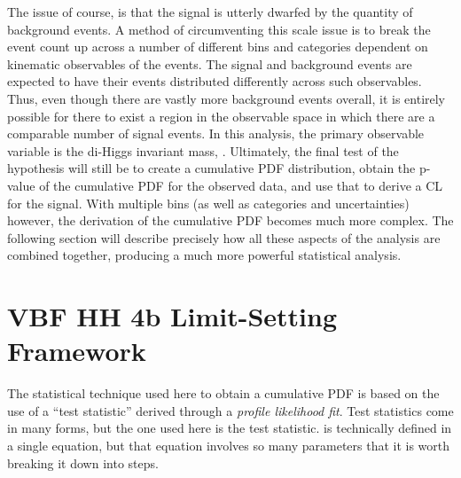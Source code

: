     The issue of course, is that the signal is utterly dwarfed by the quantity of background events.
    A method of circumventing this scale issue
        is to break the event count up across a number of different
        bins and categories dependent on kinematic observables of the events.
    The signal and background events are expected to have their events distributed differently across such observables.
    Thus, even though there are vastly more background events overall,
        it is entirely possible for there to exist a region in the observable space
        in which there are a comparable number of signal events.
    In this analysis, the primary observable variable is the di-Higgs invariant mass, \mhh.
    Ultimately, the final test of the hypothesis will still be to create a cumulative PDF distribution,
        obtain the p-value of the cumulative PDF for the observed data, and use that to derive a CL for the signal.
    With multiple bins (as well as categories and uncertainties) however,
        the derivation of the cumulative PDF becomes much more complex.
    The following section will describe precisely how all these aspects of the analysis are combined together,
        producing a much more powerful statistical analysis.


\FloatBarrier
\section{VBF HH 4b Limit-Setting Framework}
    
    The statistical technique used here to obtain a cumulative PDF
        is based on the use of a ``test statistic'' derived through a \textit{profile likelihood fit}.
    Test statistics come in many forms, but the one used here is the \qtil test statistic.
    \qtil is technically defined in a single equation,
        but that equation involves so many parameters that it is worth breaking it down into steps.


